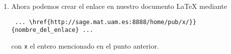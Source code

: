 \begin{appendices}
\begin{enumerate}
\begin{enumerate}
 \item Ahora podemos crear el enlace en nuestro documento {\LaTeX} mediante 
 \small
 \begin{center}
 \begin{verbatim}
 ... \href{http://sage.mat.uam.es:8888/home/pub/x/}}{nombre_del_enlace} ...
 \end{verbatim}
 \end{center}
 \normalsize
 \noindent con {\tt x} el entero mencionado en el punto anterior.
\end{enumerate}




\end{enumerate}




\end{appendices}








